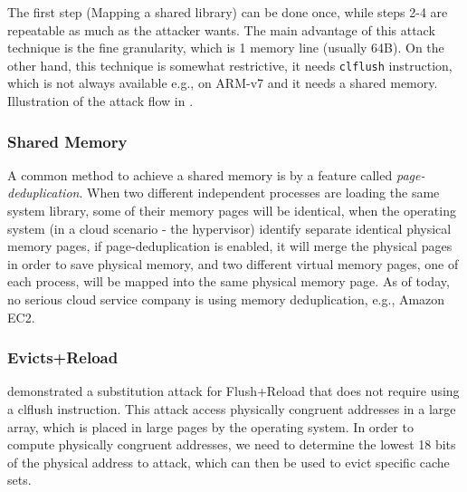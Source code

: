 \noindent The first step (Mapping a shared library) can be done once, while
steps 2-4 are repeatable as much as the attacker wants. The main advantage of
this attack technique is the fine granularity, which is 1 memory line (usually
64B). On the other hand, this technique is somewhat restrictive, it needs
\texttt{clflush} instruction, which is not always available e.g., on ARM-v7 and
it needs a shared memory. Illustration of the attack flow in .

\subsubsection{Shared Memory}
\label{subsubsec:sharedmemory}
A common method to achieve a shared memory is by a feature called
\textit{page-deduplication}. When two different independent processes are
loading the same system library, some of their memory pages will be identical,
when the operating system (in a cloud scenario - the hypervisor) identify
separate identical physical memory pages, if page-deduplication is enabled, it
will merge the physical pages in order to save physical memory, and two
different virtual memory pages, one of each process, will be mapped into the
same physical memory page. As of today, no serious cloud service company is using memory deduplication, e.g., Amazon EC2.

\subsubsection{Evicts+Reload}
\label{subsubsec:evictreload}
\cite{Gruss2015} demonstrated a substitution attack for Flush+Reload that does not require using a clflush instruction.
This attack access physically congruent addresses in a large array, which is placed in large pages by the operating system. In order to compute physically congruent addresses, we need to determine the lowest 18 bits of the physical address to attack, which can then be used to evict specific cache sets.

